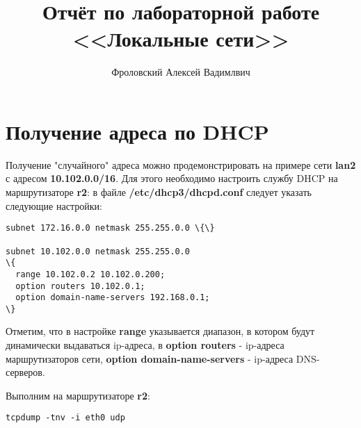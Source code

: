 \documentclass[a4paper,12pt]{article}
\title{Отчёт по лабораторной работе \\ <<Локальные сети>>}
\author{Фроловский Алексей Вадимлвич}
\begin{document}
\maketitle

\tableofcontents


\section{Получение адреса по DHCP}

Получение "случайного" адреса можно продемонстрировать на примере
сети \textbf{lan2} с адресом \textbf{10.102.0.0/16}. Для этого
необходимо настроить службу DHCP на маршрутизаторе \textbf{r2}:
в файле \textbf{/etc/dhcp3/dhcpd.conf} следует указать следующие
настройки:
\begin{Verbatim}
subnet 172.16.0.0 netmask 255.255.0.0 \{\}

subnet 10.102.0.0 netmask 255.255.0.0
\{
  range 10.102.0.2 10.102.0.200;
  option routers 10.102.0.1;
  option domain-name-servers 192.168.0.1;
\}
\end{Verbatim}

Отметим, что в настройке \textbf{range} указывается диапазон,
в котором будут динамически выдаваться ip-адреса, в
\textbf{option routers} - ip-адреса маршрутизаторов сети,
\textbf{option domain-name-servers} - ip-адреса DNS-серверов.

Выполним на маршрутизаторе \textbf{r2}:
\begin{Verbatim}
tcpdump -tnv -i eth0 udp
\end{Verbatim}
\end{document}
